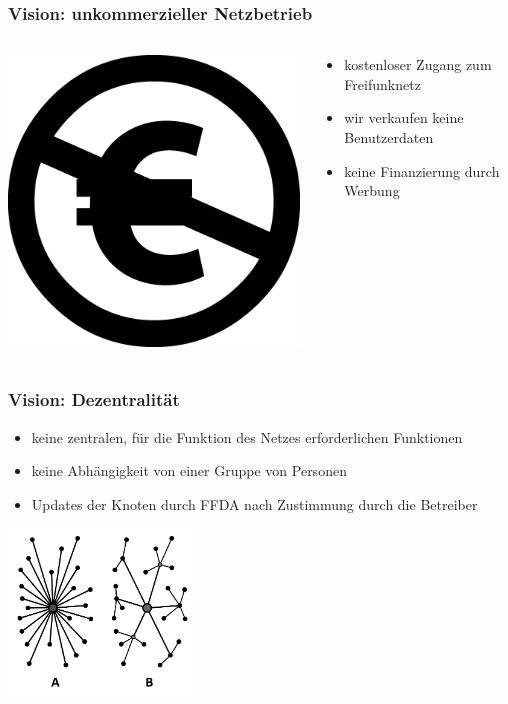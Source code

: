 \documentclass[10pt]{beamer}
\begin{document}
\begin{frame}
	\frametitle{Vision: unkommerzieller Netzbetrieb}
	\begin{columns}[c]
		\begin{column}{4cm}
			\includegraphics[width=\textwidth]{images/non-commercial-eu}
		\end{column}
		\begin{column}{8cm}
			\begin{itemize}[<+->]
				\item kostenloser Zugang zum Freifunknetz
				\item wir verkaufen keine Benutzerdaten
				\item keine Finanzierung durch Werbung
			\end{itemize}
		\end{column}
	\end{columns}	
\end{frame}

\begin{frame}
	\frametitle{Vision: Dezentralität}
	
	\begin{itemize}[<+->]
		\item keine zentralen, für die Funktion des Netzes erforderlichen Funktionen
		\item keine Abhängigkeit von einer Gruppe von Personen
		\item Updates der Knoten durch FFDA nach Zustimmung durch die Betreiber
	\end{itemize}
	\centering
	\vfill
	\includegraphics[width=5cm]{images/decentral}
\end{frame}
\end{document}
